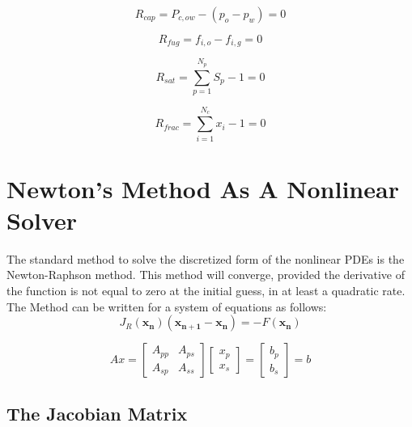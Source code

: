 \begin{equation}
	R_{cap} = P_{c,ow} - (p_{o} - p_{w}) = 0
\end{equation}

\begin{equation}
	R_{fug} = f_{i,o} - f_{i,g} = 0
\end{equation}

\begin{equation}
	R_{sat} = \sum_{p=1}^{N_{p}}S_{p} - 1 = 0
\end{equation}

\begin{equation}
	R_{frac} = \sum_{i=1}^{N_{c}}x_{i} - 1 = 0
\end{equation}

\section{Newton's Method As A Nonlinear Solver}
The standard method to solve the discretized form of the nonlinear PDEs is the Newton-Raphson method. This method 
will converge, provided the derivative of the function is not equal to zero at the initial guess, in at least
a quadratic rate. The Method can be written for a system of equations as follows:
\begin{equation}
J_{R}(\mathbf{x_{n}})(\mathbf{x_{n+1} - x_{n}}) = -F(\mathbf{x_{n}})
\end{equation}

\begin{equation}
	Ax = 
\begin{bmatrix}
	A_{pp} & A_{ps}\\
	A_{sp} & A_{ss}
\end{bmatrix}
\begin{bmatrix}
	x_{p} \\
	x_{s}
\end{bmatrix}
=
\begin{bmatrix}
	b_{p} \\
	b_{s}
\end{bmatrix}
=
b
\end{equation}

\subsection{The Jacobian Matrix}

